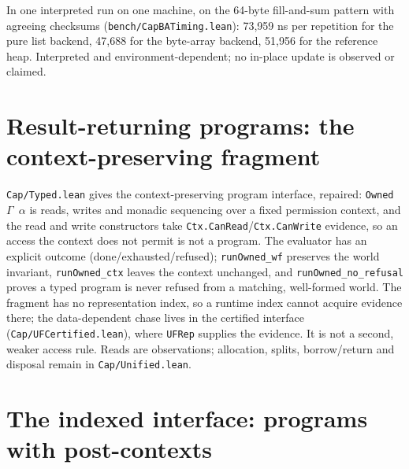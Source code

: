 \documentclass[10pt,a4paper]{article}
\newcommand{\file}[1]{\texttt{\small #1}}
\begin{document}
In one interpreted run on one machine, on the 64-byte fill-and-sum pattern with
agreeing checksums (\texttt{bench/CapBATiming.lean}): 73,959 ns per repetition
for the pure list backend, 47,688 for the byte-array backend, 51,956 for the
reference heap. Interpreted and environment-dependent; no in-place update is
observed or claimed.

\section{Result-returning programs: the context-preserving fragment}

\file{Cap/Typed.lean} gives the context-preserving program interface, repaired:
\texttt{Owned \(\Gamma\) \(\alpha\)} is reads, writes and monadic sequencing over a
fixed permission context, and the read and write constructors take
\texttt{Ctx.CanRead}/\texttt{Ctx.CanWrite} evidence, so an access the context
does not permit is not a program. The evaluator has an explicit outcome
(done/exhausted/refused); \texttt{runOwned\_wf} preserves the world invariant,
\texttt{runOwned\_ctx} leaves the context unchanged, and
\texttt{runOwned\_no\_refusal} proves a typed program is never refused from a
matching, well-formed world. The fragment has no representation index, so a
runtime index cannot acquire evidence there; the data-dependent chase lives in
the certified interface (\file{Cap/UFCertified.lean}), where \texttt{UFRep}
supplies the evidence. It is not a second, weaker access rule. Reads are
observations; allocation, splits, borrow/return and disposal remain in
\file{Cap/Unified.lean}.

\section{The indexed interface: programs with post-contexts}
\end{document}

